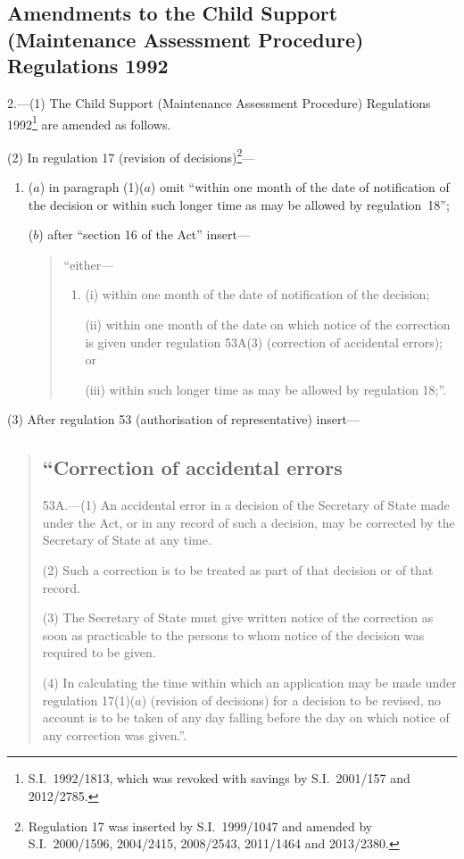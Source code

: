 \documentclass[12pt,a4paper]{article}
\begin{document}
\subsection[2. Amendments to the Child Support (Maintenance Assessment Procedure) Regulations 1992]{Amendments to the Child Support (Maintenance Assessment Procedure) Regulations 1992}

2.—(1) The Child Support (Maintenance Assessment Procedure) Regulations 1992\footnote{S.I.~1992/1813, which was revoked with savings by S.I.~2001/157 and 2012/2785.} are amended as follows.

(2) In regulation 17 (revision of decisions)\footnote{Regulation 17 was inserted by S.I.~1999/1047 and amended by S.I.~2000/1596, 2004/2415, 2008/2543, 2011/1464 and 2013/2380.}—
\begin{enumerate}\item[]
($a$) in paragraph (1)($a$)  omit “within one month of the date of notification of the decision or within such longer time as may be allowed by regulation~18”;

($b$) after “section 16 of the Act” insert—
\begin{quotation}
“either—
\begin{enumerate}\item[]
(i) within one month of the date of notification of the decision;

(ii) within one month of the date on which notice of the correction is given under regulation 53A(3) (correction of accidental errors); or

(iii) within such longer time as may be allowed by regulation 18;”.
\end{enumerate}
\end{quotation}
\end{enumerate}

(3) After regulation 53 (authorisation of representative) insert—
\begin{quotation}
\subsection*{“Correction of accidental errors}

53A.—(1) An accidental error in a decision of the Secretary of State made under the Act, or in any record of such a decision, may be corrected by the Secretary of State at any time.

(2) Such a correction is to be treated as part of that decision or of that record.

(3) The Secretary of State must give written notice of the correction as soon as practicable to the persons to whom notice of the decision was required to be given.

(4) In calculating the time within which an application may be made under regulation 17(1)($a$)  (revision of decisions) for a decision to be revised, no account is to be taken of any day falling before the day on which notice of any correction was given.”.
\end{quotation}
\end{document}
